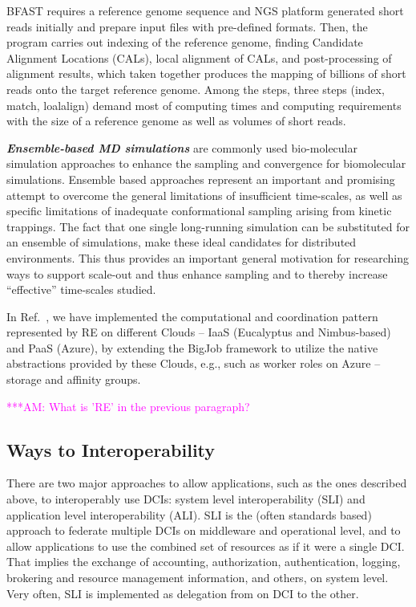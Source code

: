 \documentclass[10pt,conference,final,letterpaper,twoside,twocolumn,]{IEEEtran}
\newcommand{\amnote}[1]{  {\textcolor{magenta} {***AM: #1}}}
\newcommand{\amnote}[1]{}
\newcommand{\I}[1]{\textit{#1}}
\newcommand{\B}[1]{\textbf{#1}}
\newcommand{\BI}[1]{\B{\I{#1}}}
\begin{document}
 BFAST requires a reference genome sequence and NGS platform generated
 short reads initially and prepare input files with pre-defined
 formats.  Then, the program carries out indexing of the reference
 genome, finding Candidate Alignment Locations (CALs), local alignment
 of CALs, and post-processing of alignment results, which taken
 together produces the mapping of billions of short reads onto the
 target reference genome.  Among the steps, three steps (index, match,
 loalalign) demand most of computing times and computing requirements
 with the size of a reference genome as well as volumes of short
 reads.
 
 \BI{Ensemble-based MD simulations} are commonly used bio-molecular
 simulation approaches to enhance the sampling and convergence for
 biomolecular simulations.  Ensemble based approaches represent an
 important and promising attempt to overcome the general limitations
 of insufficient time-scales, as well as specific limitations of
 inadequate conformational sampling arising from kinetic trappings.
 The fact that one single long-running simulation can be substituted
 for an ensemble of simulations, make these ideal candidates for
 distributed environments.  This thus provides an important general
 motivation for researching ways to support scale-out and thus enhance
 sampling and to thereby increase ``effective'' time-scales studied.
 
 In Ref.~\cite{ccgrid10, cloudcom10}, we have implemented the
 computational and coordination pattern represented by RE on different
 Clouds -- IaaS (Eucalyptus and Nimbus-based) and PaaS (Azure), by
 extending the BigJob framework to utilize the native abstractions
 provided by these Clouds, e.g., such as worker roles on Azure --
 storage and affinity groups.
 
 \amnote{What is 'RE' in the previous paragraph?}


 \subsection*{Ways to Interoperability}
 
 There are two major approaches to allow applications, such as the
 ones described above, to interoperably use DCIs: system level
 interoperability (SLI) and application level interoperability (ALI).
 SLI is the (often standards based) approach to federate multiple DCIs
 on middleware and operational level, and to allow applications to use
 the combined set of resources as if it were a single DCI.  That
 implies the exchange of accounting, authorization, authentication,
 logging, brokering and resource management information, and others,
 on system level.  Very often, SLI is implemented as delegation from
 on DCI to the other.
\end{document}
